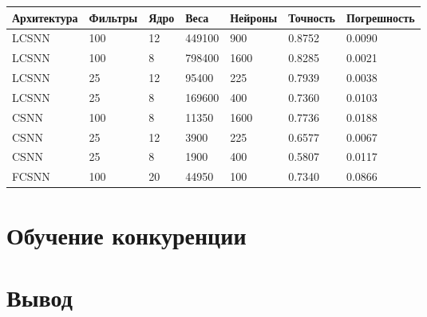 \documentclass[a4paper]{article}
\begin{document}
\begin{center}
\begin{tabular}{|l|l|l|l|l|l|l|}
\hline
{Архитектура} & {Фильтры} & {Ядро} & {Веса} & {Нейроны} & {Точность} & {Погрешность}\\
\hline
{LCSNN} & {100} & {12} & {449100} & {900} & {0.8752} & {0.0090}\\
\hline
{LCSNN} & {100} & {8} & {798400} & {1600} & {0.8285} & {0.0021}\\
\hline
{LCSNN} & {25} & {12} & {95400} & {225} & {0.7939} & {0.0038}\\
\hline
{LCSNN} & {25} & {8} & {169600} & {400} & {0.7360} & {0.0103}\\
\hline
{CSNN} & {100} & {8} & {11350} & {1600} & {0.7736} & {0.0188}\\
\hline
{CSNN} & {25} & {12} & {3900} & {225} & {0.6577} & {0.0067}\\
\hline
{CSNN} & {25} & {8} & {1900} & {400} & {0.5807} & {0.0117}\\
\hline
{FCSNN} & {100} & {20} & {44950} & {100} & {0.7340} & {0.0866}\\
\hline
\end{tabular}
\end{center}


\section{Обучение конкуренции}

\section{Вывод}
 
\printbibliography
\end{document}
